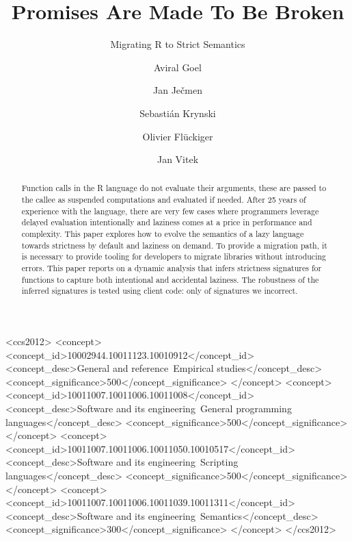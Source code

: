 \documentclass[review,creen,acmsmall]{acmart}
\begin{document}
\title{Promises Are Made To Be Broken}
\subtitle{Migrating R to Strict Semantics}

\author{Aviral Goel}
\author{Jan Ječmen}
\author{Sebastián Krynski}
\author{Olivier Flückiger}
\author{Jan Vitek}
\authorsaddresses{}
\renewcommand{\shortauthors}{Goel, et al.}

\begin{abstract}
  Function calls in the R language do not evaluate their arguments, these are
  passed to the callee as suspended computations and evaluated if needed. After
  25 years of experience with the language, there are very few cases where
  programmers leverage delayed evaluation intentionally and laziness comes at a
  price in performance and complexity. This paper explores how to evolve the
  semantics of a lazy language towards strictness by default and laziness on
  demand. To provide a migration path, it is necessary to provide tooling for
  developers to migrate libraries without introducing errors. This paper reports
  on a dynamic analysis that infers strictness signatures for functions to
  capture both intentional and accidental laziness. The robustness of the
  inferred signatures is tested using client code: only \robustnesResult of
  signatures we incorrect.
\end{abstract}

\begin{CCSXML}
<ccs2012>
<concept>
<concept_id>10002944.10011123.10010912</concept_id>
<concept_desc>General and reference~Empirical studies</concept_desc>
<concept_significance>500</concept_significance>
</concept>
<concept>
<concept_id>10011007.10011006.10011008</concept_id>
<concept_desc>Software and its engineering~General programming languages</concept_desc>
<concept_significance>500</concept_significance>
</concept>
<concept>
<concept_id>10011007.10011006.10011050.10010517</concept_id>
<concept_desc>Software and its engineering~Scripting languages</concept_desc>
<concept_significance>500</concept_significance>
</concept>
<concept>
<concept_id>10011007.10011006.10011039.10011311</concept_id>
<concept_desc>Software and its engineering~Semantics</concept_desc>
<concept_significance>300</concept_significance>
</concept>
</ccs2012>
\end{CCSXML}
\end{document}
